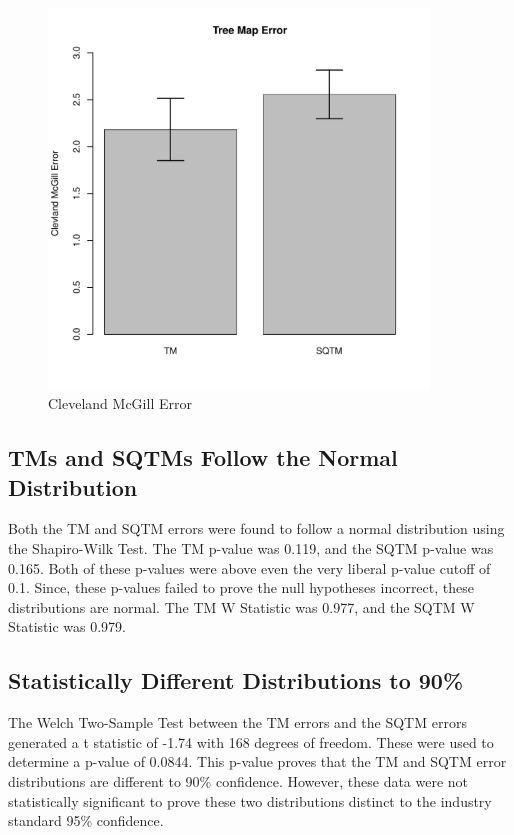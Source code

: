 \documentclass{article}
\begin{document}
\begin{figure}
\includegraphics[width=0.9\textwidth]{mapsBarPlot.pdf}
\caption{Cleveland McGill Error}
\end{figure}

\subsection*{TMs and SQTMs Follow the Normal Distribution}
Both the TM and SQTM errors were found to follow a normal distribution using the Shapiro-Wilk Test. The TM p-value was 0.119, and the SQTM p-value was 0.165. Both of these p-values were above even the very liberal p-value cutoff of 0.1. Since, these
p-values failed to prove the null hypotheses incorrect, these distributions are normal. The TM W Statistic was 0.977, and the SQTM W Statistic was 0.979.

\subsection*{Statistically Different Distributions to 90\%}
The Welch Two-Sample Test between the TM errors and the SQTM errors generated a t statistic of -1.74 with 168 degrees of freedom. These were used to determine a p-value of 0.0844. This p-value proves that the TM and SQTM error distributions are
different to 90\% confidence. However, these data were not statistically significant to prove these two distributions distinct to the
industry standard 95\% confidence. 
\end{document}
